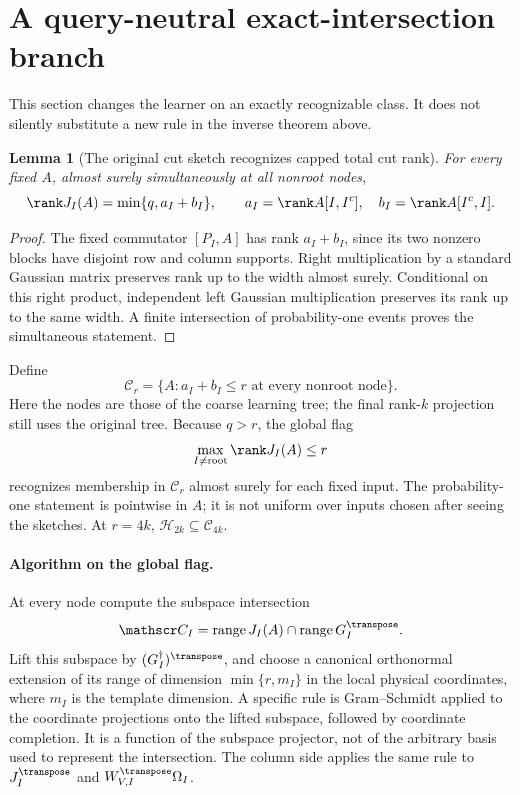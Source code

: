 \documentclass[11pt,oneside,openany,a4paper]{book}
\numberwithin{equation}{chapter}
\newtheorem{lemma}[theorem]{Lemma}
\theoremstyle{definition}
\theoremstyle{remark}
\DeclareMathOperator{\ran}{range}\DeclareMathOperator{\OPT}{OPT}
\newcommand{\HH}{\mathcal H}\newcommand{\SSS}{\mathcal S}
\begin{document}
\section{A query-neutral exact-intersection branch}
This section changes the learner on an exactly recognizable class. It does not silently substitute a new rule in the inverse theorem above.

\begin{lemma}[The original cut sketch recognizes capped total cut rank]\label{ports:lem:rankflag}
For every fixed $A$, almost surely simultaneously at all nonroot nodes,
\begin{equation}\label{ports:eq:rankflag}
 \rank J_I(A)=\min\{q,a_I+b_I\},\qquad
 a_I=\rank A[I,I^c],\quad b_I=\rank A[I^c,I].
\end{equation}
\end{lemma}
\begin{proof}
The fixed commutator $[P_I,A]$ has rank $a_I+b_I$, since its two nonzero blocks have disjoint row and column supports. Right multiplication by a standard Gaussian matrix preserves rank up to the width almost surely. Conditional on this right product, independent left Gaussian multiplication preserves its rank up to the same width. A finite intersection of probability-one events proves the simultaneous statement.
\end{proof}

Define
\[
 \mathcal C_r=\{A:a_I+b_I\le r\text{ at every nonroot node}\}.
\]
Here the nodes are those of the coarse learning tree; the final rank-$k$ projection still uses the original tree. Because $q>r$, the global flag
\begin{equation}\label{ports:eq:flag}
 \max_{I\ne\mathrm{root}}\rank J_I(A)\le r
\end{equation}
recognizes membership in $\mathcal C_r$ almost surely for each fixed input. The probability-one statement is pointwise in $A$; it is not uniform over inputs chosen after seeing the sketches. At $r=4k$, $\HH_{2k}\subseteq\mathcal C_{4k}$.

\paragraph{Algorithm on the global flag.}
At every node compute the subspace intersection
\begin{equation}\label{ports:eq:intersection}
 \mathscr C_I=\ran J_I(A)\cap\ran G_I^\transpose.
\end{equation}
Lift this subspace by $(G_I^\dagger)^\transpose$, and choose a canonical orthonormal extension of its range of dimension $\min\{r,m_I\}$ in the local physical coordinates, where $m_I$ is the template dimension. A specific rule is Gram--Schmidt applied to the coordinate projections onto the lifted subspace, followed by coordinate completion. It is a function of the subspace projector, not of the arbitrary basis used to represent the intersection. The column side applies the same rule to $J_I^\transpose$ and $W_{V,I}^\transpose\Omega_I$.
\end{document}
